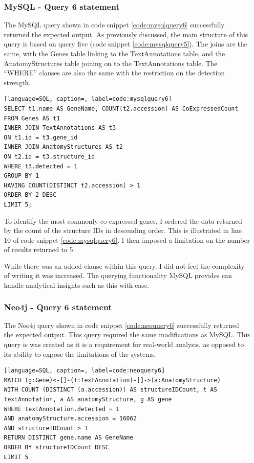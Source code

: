 \subsubsection*{MySQL - Query 6 statement}\label{mysqlquery6statement}
The MySQL query shown in code snippet \ref{code:mysqlquery6} successfully returned the expected output. As previously discussed, the main structure of this query is based on query five (code snippet \ref{code:mysqlquery5}). The joins are the same, with the Genes table linking to the TextAnnotations table, and the AnatomyStructures table joining on to the TextAnnotations table. The ``WHERE'' clauses are also the same with the restriction on the detection strength.

\begin{lstlisting}[language=SQL, caption=, label=code:mysqlquery6]
SELECT t1.name AS GeneName, COUNT(t2.accession) AS CoExpressedCount
FROM Genes AS t1
INNER JOIN TextAnnotations AS t3
ON t1.id = t3.gene_id
INNER JOIN AnatomyStructures AS t2
ON t2.id = t3.structure_id
WHERE t3.detected = 1
GROUP BY 1
HAVING COUNT(DISTINCT t2.accession) > 1
ORDER BY 2 DESC
LIMIT 5;
\end{lstlisting}

To identify the most commonly co-expressed genes, I ordered the data returned by the count of the structure IDs in descending order. This is illustrated in line 10 of code snippet \ref{code:mysqlquery6}. I then imposed a limitation on the number of results returned to 5.

While there was an added clause within this query, I did not feel the complexity of writing it was increased. The querying functionality MySQL provides can handle analytical insights such as this with ease.

\subsubsection*{Neo4j - Query 6 statement}\label{neoquery6statement}
The Neo4j query shown in code snippet \ref{code:neoquery6} successfully returned the expected output. This query required the same modifications as MySQL. This query is was created as it is a requirement for real-world analysis, as opposed to its ability to expose the limitations of the systems.

\begin{lstlisting}[language=SQL, caption=, label=code:neoquery6]
MATCH (g:Gene)<-[]-(t:TextAnnotation)-[]->(a:AnatomyStructure)
WITH COUNT (DISTINCT (a.accession)) AS structureIDCount, t AS textAnnotation, a AS anatomyStructure, g AS gene
WHERE textAnnotation.detected = 1
AND anatomyStructure.accession = 16062
AND structureIDCount > 1
RETURN DISTINCT gene.name AS GeneName
ORDER BY structureIDCount DESC
LIMIT 5
\end{lstlisting}


